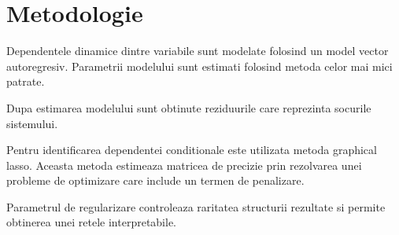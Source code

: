\chapter{Metodologie}

Dependentele dinamice dintre variabile sunt modelate folosind un model vector autoregresiv. Parametrii modelului sunt estimati folosind metoda celor mai mici patrate.

Dupa estimarea modelului sunt obtinute reziduurile care reprezinta socurile sistemului.

Pentru identificarea dependentei conditionale este utilizata metoda graphical lasso. Aceasta metoda estimeaza matricea de precizie prin rezolvarea unei probleme de optimizare care include un termen de penalizare.

Parametrul de regularizare controleaza raritatea structurii rezultate si permite obtinerea unei retele interpretabile.